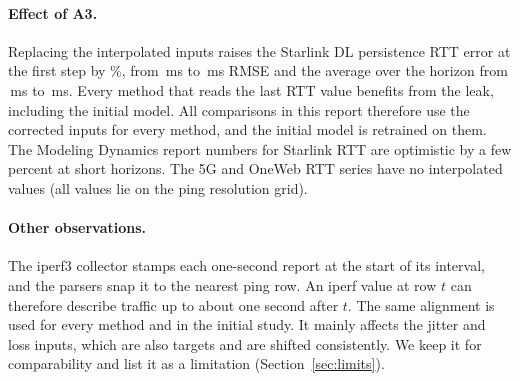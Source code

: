\paragraph{Effect of A3.} Replacing the interpolated inputs raises the Starlink DL persistence RTT error at the first step by \AuditPersHonePct\%, from \AuditPersLegacyHone\,ms to \AuditPersCausalHone\,ms RMSE and the average over the horizon from \AuditPersLegacyAvg\,ms to \AuditPersCausalAvg\,ms. Every method that reads the last RTT value benefits from the leak, including the initial model. All comparisons in this report therefore use the corrected inputs for every method, and the initial model is retrained on them. The Modeling Dynamics report numbers for Starlink RTT are optimistic by a few percent at short horizons. The 5G and OneWeb RTT series have no interpolated values (all values lie on the ping resolution grid).

\paragraph{Other observations.} The iperf3 collector stamps each one-second report at the start of its interval, and the parsers snap it to the nearest ping row. An iperf value at row $t$ can therefore describe traffic up to about one second after $t$. The same alignment is used for every method and in the initial study. It mainly affects the jitter and loss inputs, which are also targets and are shifted consistently. We keep it for comparability and list it as a limitation (Section~\ref{sec:limits}).
